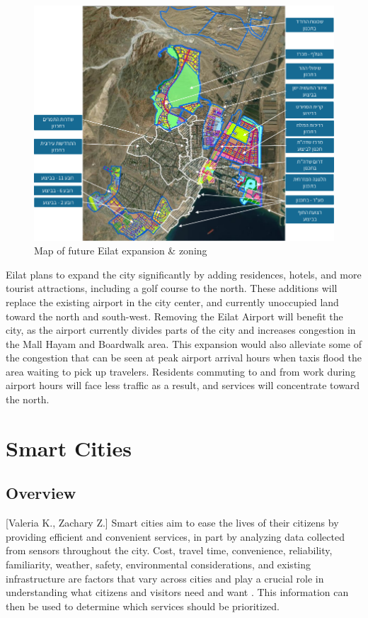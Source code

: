 \documentclass[12pt]{article}                       %
\begin{document}
\begin{figure}[H]
    \centering
    \includegraphics[width=12cm]{images/eilat_zoning_future.png}
    \caption{Map of future Eilat expansion \& zoning}
    \label{img:eilat_expansion}
\end{figure}

Eilat plans to expand the city significantly by adding residences, hotels, and more tourist attractions, including a golf course to the north. These additions will replace the existing airport in the city center, and currently unoccupied land toward the north and south-west. Removing the Eilat Airport will benefit the city, as the airport currently divides parts of the city and increases congestion in the Mall Hayam and Boardwalk area. This expansion would also alleviate some of the congestion that can be seen at peak airport arrival hours when taxis flood the area waiting to pick up travelers. Residents commuting to and from work during airport hours will face less traffic as a result, and services will concentrate toward the north. 

\newpage
\section{Smart Cities}
\subsection{Overview}[Valeria K., Zachary Z.]
Smart cities aim  to ease the lives of their citizens by providing efficient and convenient services, in part by analyzing data collected from sensors throughout the city. Cost, travel time, convenience, reliability, familiarity, weather, safety, environmental considerations, and existing infrastructure are factors that vary across cities and play a crucial role in understanding what citizens and visitors need and want \cite{2016LiveChallenge}. This information can then be used to determine which services should be prioritized.
\end{document}
